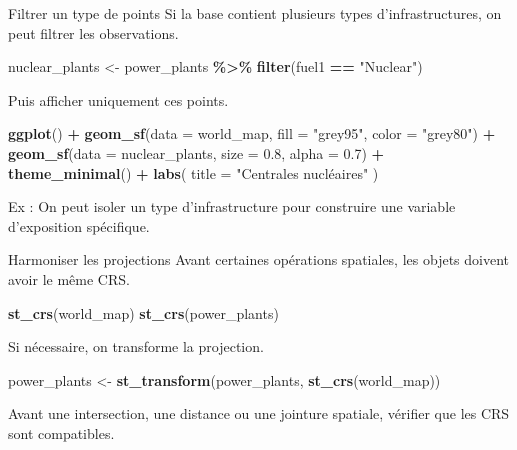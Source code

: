 \documentclass[
  10pt,
  ignorenonframetext,
]{beamer}
\newenvironment{Shaded}{\begin{snugshade}}{\end{snugshade}}
\newcommand{\AttributeTok}[1]{\textcolor[rgb]{0.13,0.29,0.53}{#1}}
\newcommand{\FloatTok}[1]{\textcolor[rgb]{0.00,0.00,0.81}{#1}}
\newcommand{\FunctionTok}[1]{\textcolor[rgb]{0.13,0.29,0.53}{\textbf{#1}}}
\newcommand{\NormalTok}[1]{#1}
\newcommand{\OtherTok}[1]{\textcolor[rgb]{0.56,0.35,0.01}{#1}}
\newcommand{\SpecialCharTok}[1]{\textcolor[rgb]{0.81,0.36,0.00}{\textbf{#1}}}
\newcommand{\StringTok}[1]{\textcolor[rgb]{0.31,0.60,0.02}{#1}}
\begin{document}
\begin{frame}[fragile]{Filtrer un type de points}
\label{filtrer-un-type-de-points}
Si la base contient plusieurs types d'infrastructures, on peut filtrer
les observations.

\begin{Shaded}
\begin{Highlighting}[]
\NormalTok{nuclear\_plants }\OtherTok{\textless{}{-}}\NormalTok{ power\_plants }\SpecialCharTok{\%\textgreater{}\%}
  \FunctionTok{filter}\NormalTok{(fuel1 }\SpecialCharTok{==} \StringTok{"Nuclear"}\NormalTok{)}
\end{Highlighting}
\end{Shaded}

Puis afficher uniquement ces points.

\begin{Shaded}
\begin{Highlighting}[]
\FunctionTok{ggplot}\NormalTok{() }\SpecialCharTok{+}
  \FunctionTok{geom\_sf}\NormalTok{(}\AttributeTok{data =}\NormalTok{ world\_map, }\AttributeTok{fill =} \StringTok{"grey95"}\NormalTok{, }\AttributeTok{color =} \StringTok{"grey80"}\NormalTok{) }\SpecialCharTok{+}
  \FunctionTok{geom\_sf}\NormalTok{(}\AttributeTok{data =}\NormalTok{ nuclear\_plants, }\AttributeTok{size =} \FloatTok{0.8}\NormalTok{, }\AttributeTok{alpha =} \FloatTok{0.7}\NormalTok{) }\SpecialCharTok{+}
  \FunctionTok{theme\_minimal}\NormalTok{() }\SpecialCharTok{+}
  \FunctionTok{labs}\NormalTok{(}
    \AttributeTok{title =} \StringTok{"Centrales nucléaires"}
\NormalTok{  )}
\end{Highlighting}
\end{Shaded}

Ex : On peut isoler un type d'infrastructure pour construire une
variable d'exposition spécifique.
\end{frame}

\begin{frame}[fragile]{Harmoniser les projections}
\label{harmoniser-les-projections}
Avant certaines opérations spatiales, les objets doivent avoir le même
CRS.

\begin{Shaded}
\begin{Highlighting}[]
\FunctionTok{st\_crs}\NormalTok{(world\_map)}
\FunctionTok{st\_crs}\NormalTok{(power\_plants)}
\end{Highlighting}
\end{Shaded}

Si nécessaire, on transforme la projection.

\begin{Shaded}
\begin{Highlighting}[]
\NormalTok{power\_plants }\OtherTok{\textless{}{-}} \FunctionTok{st\_transform}\NormalTok{(power\_plants, }\FunctionTok{st\_crs}\NormalTok{(world\_map))}
\end{Highlighting}
\end{Shaded}

Avant une intersection, une distance ou une jointure spatiale, vérifier
que les CRS sont compatibles.
\end{frame}
\end{document}
